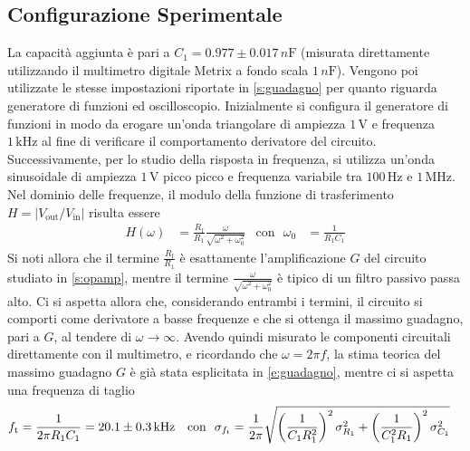\documentclass[a4paper,11pt]{article} %
\begin{document}
\subsection{Configurazione Sperimentale}
La capacità aggiunta è pari a $C_{1} = 0.977 \pm 0.017 \,\si{n\farad}$ (misurata direttamente utilizzando il multimetro
digitale Metrix a fondo scala $1\,\si{n\farad}$). Vengono poi utilizzate le stesse impostazioni riportate in
\autoref{s:guadagno} per quanto riguarda generatore di funzioni ed oscilloscopio. Inizialmente si configura il
generatore di funzioni in modo da erogare un'onda triangolare di ampiezza $1\,\si{\volt}$ e frequenza $1\,\si{\kHz}$ al
fine di verificare il comportamento derivatore del circuito. Successivamente, per lo studio della risposta in frequenza,
si utilizza un'onda sinusoidale di ampiezza $1\,\si{\volt}$ picco picco e frequenza variabile tra $100\,\si{\Hz}$ e
$1\,\si{\MHz}$. Nel dominio delle frequenze, il modulo della funzione di trasferimento
$H=\left|V_{\text{out}}/V_{\text{in}}\right|$ risulta essere
\begin{align}
	H(\omega) &= \frac{R_{\text{f}}}{R_{1}}\frac{\omega}{\sqrt{\omega^2+\omega_0^2}} & \text{con}\,\,\,\, \omega_{0}&=\frac{1}{R_{1}C_{1}}
\end{align}
\noindent Si noti allora che il termine $\frac{R_{\text{f}}}{R_{1}}$ è esattamente l'amplificazione $G$ del circuito
studiato in \autoref{s:opamp}, mentre il termine $\frac{\omega}{\sqrt{\omega^2+\omega_0^2}}$ è tipico di un filtro
passivo passa alto. Ci si aspetta allora che, considerando entrambi i termini, il circuito si comporti come derivatore a
basse frequenze e che si ottenga il massimo guadagno, pari a $G$, al tendere di $\omega\rightarrow\infty$. Avendo quindi
misurato le componenti circuitali direttamente con il multimetro, e ricordando che $\omega=2\pi f$, la stima teorica del
massimo guadagno $G$ è già stata esplicitata in \autoref{e:guadagno}, mentre ci si aspetta una frequenza di taglio
\begin{align}\label{e:diff_f_th}
	f_{\text{t}}&=\frac{1}{2\pi R_{1}C_{1}}=20.1 \pm 0.3 \,\si{k\Hz} & 
	\text{con\,\,\,\,}\sigma_{f_{\text{t}}}&=\frac{1}{2\pi}\sqrt{	\left(\frac{1}{C_{1}R_{1}^2}\right)^2\sigma_{R_{1}}^2	+
																	\left(\frac{1}{C_{1}^2R_{1}}\right)^2\sigma_{C_{1}}^2   }																	
\end{align}


\end{document}
